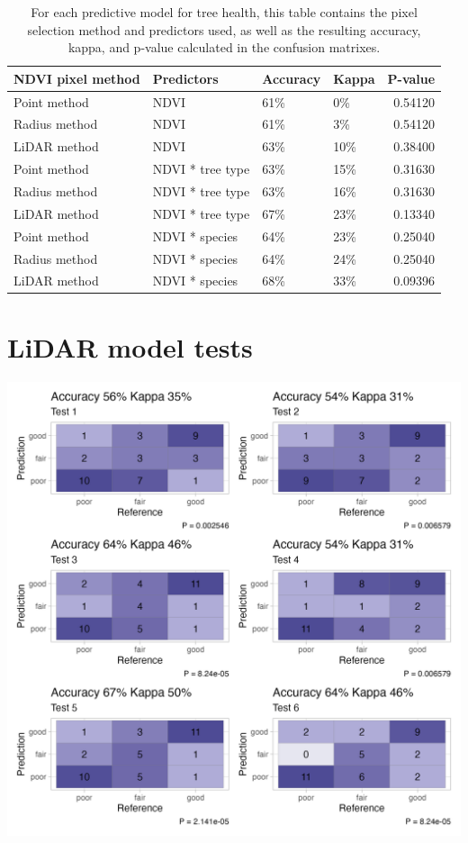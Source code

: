 \documentclass[12pt,twoside]{reedthesis}
\begin{document}
\begin{longtable}[t]{llllr}
\caption[Summary of results from various predictive models]{\label{tab:model-table}For each predictive model for tree health, this table contains the pixel selection method and predictors used, as well as the resulting accuracy, kappa, and p-value calculated in the confusion matrixes.}\\
\toprule
NDVI pixel method & Predictors & Accuracy & Kappa & P-value\\
\midrule
Point method & NDVI & 61\% & 0\% & 0.54120\\
Radius method & NDVI & 61\% & 3\% & 0.54120\\
LiDAR method & NDVI & 63\% & 10\% & 0.38400\\
Point method & NDVI * tree type & 63\% & 15\% & 0.31630\\
Radius method & NDVI * tree type & 63\% & 16\% & 0.31630\\
\addlinespace
LiDAR method & NDVI * tree type & 67\% & 23\% & 0.13340\\
Point method & NDVI * species & 64\% & 23\% & 0.25040\\
Radius method & NDVI * species & 64\% & 24\% & 0.25040\\
LiDAR method & NDVI * species & 68\% & 33\% & 0.09396\\
\bottomrule
\end{longtable}
\hypertarget{lidar-model-tests}{%
\section*{LiDAR model tests}\label{lidar-model-tests}}
\begin{center}\includegraphics[width=1\linewidth]{figure/test} \end{center}
\end{document}

